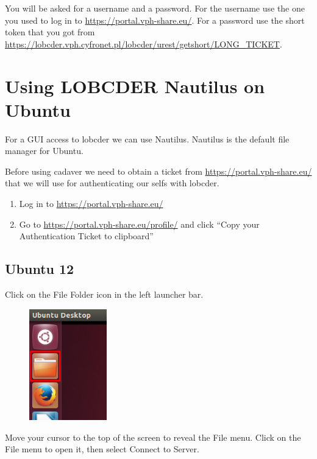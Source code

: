 \documentclass[a4paper,10pt]{report}
\begin{document}
You will be asked for a username and a password. For the username use the one you used to log in to \url{https://portal.vph-share.eu/}. For a password use the short token that you got from \url{https://lobcder.vph.cyfronet.pl/lobcder/urest/getshort/LONG_TICKET}. 



\section{Using LOBCDER Nautilus on Ubuntu}

For a GUI access to lobcder we can use Nautilus. Nautilus is the default file manager for Ubuntu. 

Before using cadaver we need to obtain a ticket from \url{https://portal.vph-share.eu/} that we will use for authenticating our selfs with lobcder. 


\begin{enumerate}
 \item Log in to \url{https://portal.vph-share.eu/}
 \item Go to \url{https://portal.vph-share.eu/profile/} and click ``Copy your Authentication Ticket to clipboard''
\end{enumerate}

\subsection{Ubuntu 12}

Click on the File Folder icon in the left launcher bar.

\begin{figure}
	\centering
	\includegraphics[width=0.3\textwidth]{graphics/ver12_1.png}\label{fig:ver12_1}
\end{figure}




Move your cursor to the top of the screen to reveal the File menu. Click on the File menu to open it, then select Connect to Server.
\end{document}
